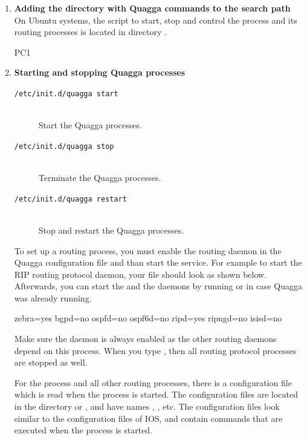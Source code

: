 \begin{enumerate}[label=\textbf{(\alph*)},labelindent=0em]
	\item \textbf{Adding the directory with Quagga commands to the search path}\hfill \\
		On Ubuntu systems, the script to start, stop and control the  process and its routing processes is located in directory . %
		\begin{cmdblock}
	PC1%
		\end{cmdblock}

	\item \textbf{Starting and stopping Quagga processes}
		\begin{description}
			\item[\texttt{/etc/init.d/quagga start}]\hfill \\
				Start the Quagga processes.
			\item[\texttt{/etc/init.d/quagga stop}]\hfill \\
				Terminate the Quagga processes.
			\item[\texttt{/etc/init.d/quagga restart}]\hfill \\
				Stop and restart the Quagga processes.
		\end{description}
		To set up a routing process, you must enable the routing daemon in the Quagga configuration file  and than start the  service. For example to start the RIP routing protocol daemon, your  file should look as shown below. Afterwards, you can start the  and the  daemons by running  or  in case Quagga was already running.
		\begin{cmdblock}
	zebra=yes
	bgpd=no
	ospfd=no
	ospf6d=no
	ripd=yes
	ripngd=no
	isisd=no
		\end{cmdblock}
		Make sure the  daemon is always enabled as the other routing daemons depend on this process. When you type , then all routing protocol processes are stopped as well.

		For the  process and all other routing processes, there is a configuration file which is read when the process is started. The configuration files are located in the directory  or , and have names , , etc. The configuration files look similar to the configuration files of IOS, and contain commands that are executed when the process is started.


\end{enumerate}
